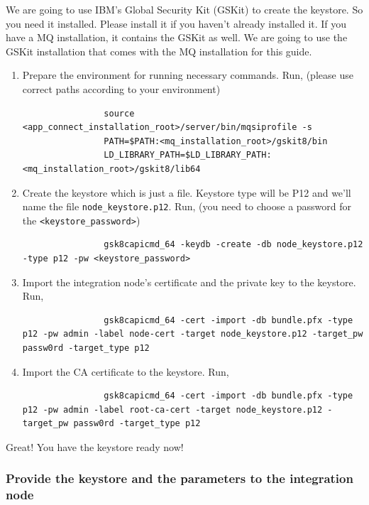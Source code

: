 \documentclass{article}
\begin{document}
\begin{enumerate}[itemsep=4ex]
        We are going to use IBM's Global Security Kit (GSKit) to create the keystore. So you need it installed. Please install it if you haven't already installed it. If you have a MQ installation, it contains the GSKit as well. We are going to use the GSKit installation that comes with the MQ installation for this guide.
        \begin{enumerate}
            \item Prepare the environment for running necessary commands. Run, (please use correct paths according to your environment)
            \begin{lstlisting}
                source <app_connect_installation_root>/server/bin/mqsiprofile -s
                PATH=$PATH:<mq_installation_root>/gskit8/bin
                LD_LIBRARY_PATH=$LD_LIBRARY_PATH:<mq_installation_root>/gskit8/lib64
            \end{lstlisting}
            \item Create the keystore which is just a file. Keystore type will be P12 and we'll name the file \texttt{node\_keystore.p12}. Run, (you need to choose a password for the \lstinline{<keystore_password>})
            \begin{lstlisting}
                gsk8capicmd_64 -keydb -create -db node_keystore.p12 -type p12 -pw <keystore_password>
            \end{lstlisting}
            \item Import the integration node's certificate and the private key to the keystore. Run,
            \begin{lstlisting}
                gsk8capicmd_64 -cert -import -db bundle.pfx -type p12 -pw admin -label node-cert -target node_keystore.p12 -target_pw passw0rd -target_type p12
            \end{lstlisting}
            \item Import the CA certificate to the keystore. Run,
            \begin{lstlisting}
                gsk8capicmd_64 -cert -import -db bundle.pfx -type p12 -pw admin -label root-ca-cert -target node_keystore.p12 -target_pw passw0rd -target_type p12
            \end{lstlisting}
        \end{enumerate}

        Great! You have the keystore ready now!

    \end{enumerate}
    \subsubsection{Provide the keystore and the parameters to the integration node}
    
\end{document}
